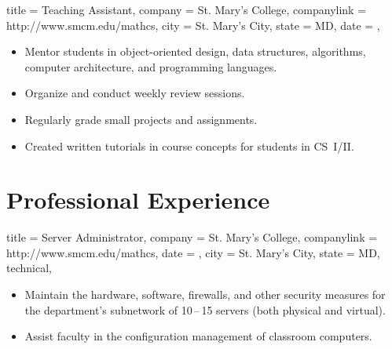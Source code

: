 \documentclass{bettercv}
\begin{document}
\begin{position}
  {
    title   = Teaching Assistant,
    company = St. Mary's College,%
    companylink = http://www.smcm.edu/mathcs,
    city    = St. Mary's City,
    state   = MD,
    date    = ,
  }

\begin{itemize}
\item Mentor students in object-oriented design, data structures, algorithms, computer architecture, and programming languages.
\item Organize and conduct weekly review sessions.
\item Regularly grade small projects and assignments.
\item Created written tutorials in course concepts for students in CS~I\slash II.
\end{itemize}
\end{position}

\section{Professional Experience}

\begin{position}
  {
    title   = Server Administrator,
    company = St. Mary's College,%
    companylink = http://www.smcm.edu/mathcs,
    date    = ,
    city    = St. Mary's City,
    state   = MD,
    technical,
  }

\begin{itemize}
\item Maintain the hardware, software, firewalls, and other security measures
  for the department's subnetwork of 10\,--\,15 servers (both physical and virtual).
\item Assist faculty in the configuration management of classroom computers.
\end{itemize}
\end{position}
\end{document}
